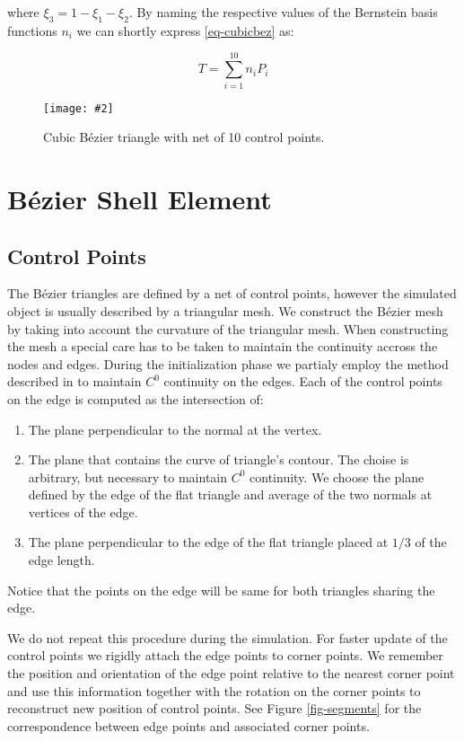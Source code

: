 \documentclass{egpubl}
\newcommand{\Figure}[3]{%
\begin{figure}[htb]
  \centering
  \texttt{[image: \#2]}
  \caption{\label{fig-#2}#3}
\end{figure}}
\begin{document}
where $ \xi_3 = 1 - \xi_1 - \xi_2 $. By naming the respective values of
the Bernstein basis functions $n_i$ we can shortly express
\eqref{eq-cubicbez} as:

\begin{equation}\label{eq-cubicbez2}
    T = \sum_{i=1}^{10} n_i P_i
\end{equation}

\Figure{0.8\linewidth}{bezier}
{Cubic Bézier triangle with net of 10 control points.}


\section{Bézier Shell Element} %

\subsection{Control Points} %

The Bézier triangles are defined by a net of control points, however the
simulated object is usually described by a triangular mesh. We construct
the Bézier mesh by taking into account the curvature of the triangular
mesh. When constructing the mesh a special care has to be taken to maintain
the continuity accross the nodes and edges. During the initialization phase
we partialy employ the method described in \cite{Ubach2010} to maintain
$C^0$ continuity on the edges. Each of the control points on the edge is
computed as the intersection of:

\begin{enumerate}
    \item The plane perpendicular to the normal at the vertex.
    \item The plane that contains the curve of triangle's contour. The
        choise is arbitrary, but necessary to maintain $C^0$ continuity. 
        We choose the plane defined by the edge of the flat triangle and
        average of the two normals at vertices of the edge. 
    \item The plane perpendicular to the edge of the flat triangle placed at
        $1/3$ of the edge length.
\end{enumerate}

Notice that the points on the edge will be same for both triangles sharing
the edge.

We do not repeat this procedure during the simulation. For faster update of
the control points we rigidly attach the edge points to corner points. We
remember the position and orientation of the edge point relative to the
nearest corner point and use this information together with the rotation on
the corner points to reconstruct new position of control points. See Figure
\ref{fig-segments} for the correspondence between edge points and
associated corner points.
\end{document}
